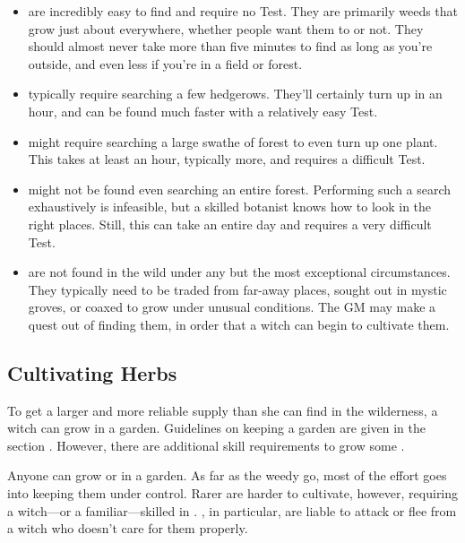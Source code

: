 \begin{itemize}
	\item
		 are incredibly easy to find and require no Test.
		They are primarily weeds that grow just about everywhere, whether people want them to or not.
		They should almost never take more than five minutes to find as long as you're outside, and even less if you're in a field or forest.
	\item
		 typically require searching a few hedgerows.
		They'll certainly turn up in an hour, and can be found much faster with a relatively easy Test.
	\item
		 might require searching a large swathe of forest to even turn up one plant.
		This takes at least an hour, typically more, and requires a difficult Test.
	\item
		 might not be found even searching an entire forest.
		Performing such a search exhaustively is infeasible, but a skilled botanist knows how to look in the right places.
		Still, this can take an entire day and requires a very difficult Test.
	\item
		 are not found in the wild under any but the most exceptional circumstances.
		They typically need to be traded from far-away places, sought out in mystic groves, or coaxed to grow under unusual conditions.
		The GM may make a quest out of finding them, in order that a witch can begin to cultivate them.
\end{itemize}

\subsection{Cultivating Herbs}

To get a larger and more reliable supply than she can find in the wilderness, a witch can grow  in a garden.
Guidelines on keeping a garden are given in the section .
However, there are additional skill requirements to grow some .

Anyone can grow  or  in a garden.
As far as the weedy  go, most of the effort goes into keeping them under control.
Rarer  are harder to cultivate, however, requiring a witch---or a familiar---skilled in .
, in particular, are liable to attack or flee from a witch who doesn't care for them properly.

